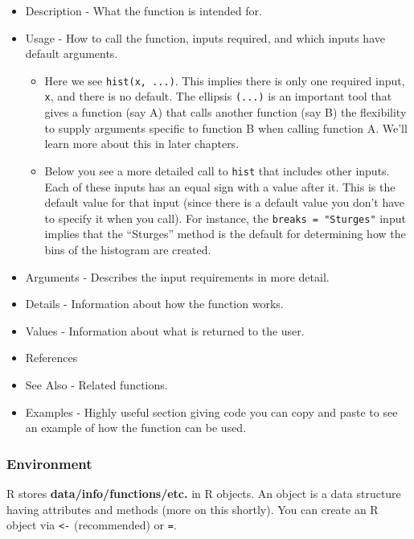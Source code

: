 \documentclass[
]{book}
\providecommand{\tightlist}{%
  \setlength{\itemsep}{0pt}\setlength{\parskip}{0pt}}
\theoremstyle{definition}
\theoremstyle{definition}
\theoremstyle{definition}
\theoremstyle{remark}
\begin{document}
\begin{itemize}
\item
  Description - What the function is intended for.
\item
  Usage - How to call the function, inputs required, and which inputs have default arguments.

  \begin{itemize}
  \tightlist
  \item
    Here we see \texttt{hist(x,\ ...)}. This implies there is only one required input, \texttt{x}, and there is no default. The ellipsis \texttt{(...)} is an important tool that gives a function (say A) that calls another function (say B) the flexibility to supply arguments specific to function B when calling function A. We'll learn more about this in later chapters.\\
  \item
    Below you see a more detailed call to \texttt{hist} that includes other inputs. Each of these inputs has an equal sign with a value after it. This is the default value for that input (since there is a default value you don't have to specify it when you call). For instance, the \texttt{breaks\ =\ "Sturges"} input implies that the ``Sturges'' method is the default for determining how the bins of the histogram are created.
  \end{itemize}
\item
  Arguments - Describes the input requirements in more detail.
\item
  Details - Information about how the function works.
\item
  Values - Information about what is returned to the user.
\item
  References
\item
  See Also - Related functions.
\item
  Examples - Highly useful section giving code you can copy and paste to see an example of how the function can be used.
\end{itemize}

\hypertarget{environment}{%
\subsubsection{Environment}\label{environment}}

R stores \textbf{data/info/functions/etc.} in R objects. An object is a data structure having attributes and methods (more on this shortly). You can create an R object via \texttt{\textless{}-} (recommended) or \texttt{=}.
\end{document}
